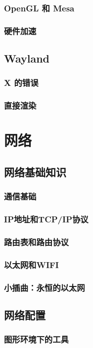 \documentclass[amstex,twoside]{ctexbook}
\begin{document}
\subsection{  OpenGL 和 Mesa	}
\subsection{  硬件加速	}
\section{  Wayland	}
\subsection{ X 的错误	}
\subsection{  直接渲染}

\chapter{网络}
\section{  网络基础知识}
\subsection{  通信基础}
\subsection{  IP地址和TCP/IP协议}
\subsection{  路由表和路由协议}
\subsection{ 以太网和WIFI}
\subsection*{  小插曲：永恒的以太网}

\section{网络配置\label{sec:ifconfig}}
\subsection{  图形环境下的工具	}
\end{document}
